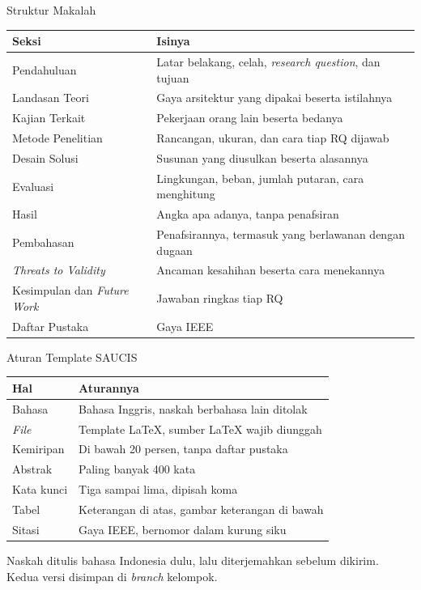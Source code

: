\documentclass[aspectratio=169, table, 12pt]{beamer}
\begin{document}
\begin{frame}{{\Large Struktur Makalah}}
  \vspace{4pt}
  \centering
  \scriptsize
  \begin{tabularx}{0.97\textwidth}{|l|X|}
    \hline
    \textbf{Seksi} & \textbf{Isinya} \\
    \hline
    Pendahuluan & Latar belakang, celah, \textit{research question}, dan tujuan \\
    \hline
    Landasan Teori & Gaya arsitektur yang dipakai beserta istilahnya \\
    \hline
    Kajian Terkait & Pekerjaan orang lain beserta bedanya \\
    \hline
    Metode Penelitian & Rancangan, ukuran, dan cara tiap RQ dijawab \\
    \hline
    Desain Solusi & Susunan yang diusulkan beserta alasannya \\
    \hline
    Evaluasi & Lingkungan, beban, jumlah putaran, cara menghitung \\
    \hline
    Hasil & Angka apa adanya, tanpa penafsiran \\
    \hline
    Pembahasan & Penafsirannya, termasuk yang berlawanan dengan dugaan \\
    \hline
    \textit{Threats to Validity} & Ancaman kesahihan beserta cara menekannya \\
    \hline
    Kesimpulan dan \textit{Future Work} & Jawaban ringkas tiap RQ \\
    \hline
    Daftar Pustaka & Gaya IEEE \\
    \hline
  \end{tabularx}
\end{frame}

\begin{frame}{{\Large Aturan Template SAUCIS}}
  \vspace{6pt}
  \centering
  \small
  \begin{tabularx}{0.95\textwidth}{|l|X|}
    \hline
    \textbf{Hal} & \textbf{Aturannya} \\
    \hline
    Bahasa & Bahasa Inggris, naskah berbahasa lain ditolak \\
    \hline
    \textit{File} & Template LaTeX, sumber LaTeX wajib diunggah \\
    \hline
    Kemiripan & Di bawah 20 persen, tanpa daftar pustaka \\
    \hline
    Abstrak & Paling banyak 400 kata \\
    \hline
    Kata kunci & Tiga sampai lima, dipisah koma \\
    \hline
    Tabel & Keterangan di atas, gambar keterangan di bawah \\
    \hline
    Sitasi & Gaya IEEE, bernomor dalam kurung siku \\
    \hline
  \end{tabularx}

  \vspace{6pt}
  \raggedright
  {\small Naskah ditulis bahasa Indonesia dulu, lalu diterjemahkan sebelum
  dikirim. Kedua versi disimpan di \textit{branch} kelompok.}
\end{frame}
\end{document}

